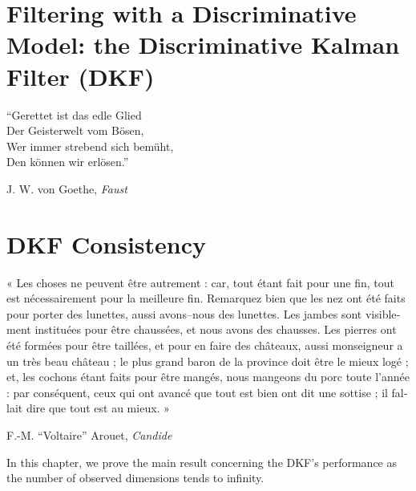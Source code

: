 \documentclass[final,nosignature]{brownthesis} %
\begin{document}
\chapter{Filtering with a Discriminative Model: the Discriminative Kalman Filter (DKF)}
\label{ch:dkf}
\epigraph{\foreignlanguage{german}{"`Gerettet ist das edle Glied\\
Der Geisterwelt vom Bösen,\\
Wer immer strebend sich bemüht,\\
Den können wir erlösen."'}}{J. W. von Goethe, \emph{Faust}~\nocite{Goe14}}


\chapter{DKF Consistency}
\epigraph{\foreignlanguage{french}{« Les choses ne peuvent être autrement : car, tout étant fait pour une fin, tout est nécessairement pour la meilleure fin. Remarquez bien que les nez ont été faits pour porter des lunettes, aussi avons--nous des lunettes. Les jambes sont visiblement instituées pour être chaussées, et nous avons des chausses. Les pierres ont été formées pour être taillées, et pour en faire des châteaux, aussi monseigneur a un très beau château ; le plus grand baron de la province doit être le mieux logé ; et, les cochons étant faits pour être mangés, nous mangeons du porc toute l'année : par conséquent, ceux qui ont avancé que tout est bien ont dit une sottise ; il fallait dire que tout est au mieux. »}}{F.-M. ``Voltaire'' Arouet, \emph{Candide}~\nocite{Aro05}}
\label{ch:consistency}
In this chapter, we prove the main result concerning the DKF's performance as the number of observed dimensions tends to infinity.

\end{document}
